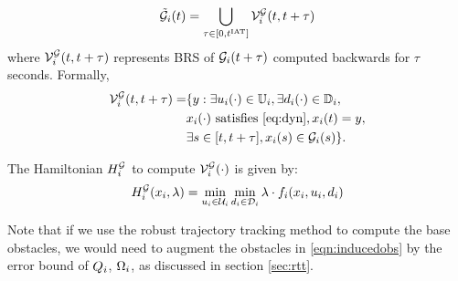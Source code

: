 \begin{equation} \label{eqn:inducedobs}
\tilde\obsset_i(t) = \bigcup_{\tau \in [0, \iat]} \brs^{\mathcal{G}}_{i}(t, t+\tau)
\end{equation}
where $\mathcal{V}^{\mathcal{G}}_{i}(t, t+\tau)$ represents BRS of $\mathcal{G}_i(t+\tau)$ computed backwards for $\tau$ seconds. Formally, 
\begin{equation} \label{eqn:inducedobs_help1}
\begin{aligned}
\brs^{\mathcal{G}}_{i}(t, t+\tau) = & \{y: \exists \ctrl_i(\cdot) \in \cfset_i, \exists \dstb_i(\cdot) \in \dfset_i, \\
& \state_i(\cdot) \text{ satisfies \eqref{eq:dyn}}, \state_i(t) = y, \\
& \exists s \in [t, t+\tau], \state_i(s) \in \obsset_i(s)\}.
\end{aligned}
\end{equation}

The Hamiltonian $H^{\mathcal{G}}_{i}$ to compute $\mathcal{V}^{\mathcal{G}}_{i}(\cdot)$ is given by:
\begin{equation} \label{eqn:BRS_obsham}
\ham^{\mathcal{G}}_{i}(\state_i, \costate) = \min_{\ctrl_i \in \cset_i} \min_{\dstb_i \in \dset_i} \costate \cdot f_i (\state_i, \ctrl_i, \dstb_i)
\end{equation}

\begin{remark}
Note that if we use the robust trajectory tracking method to compute the base obstacles, we would need to augment the obstacles in \eqref{eqn:inducedobs} by the error bound of $Q_i$, $\Omega_i$, as discussed in section \ref{sec:rtt}.
\end{remark}

